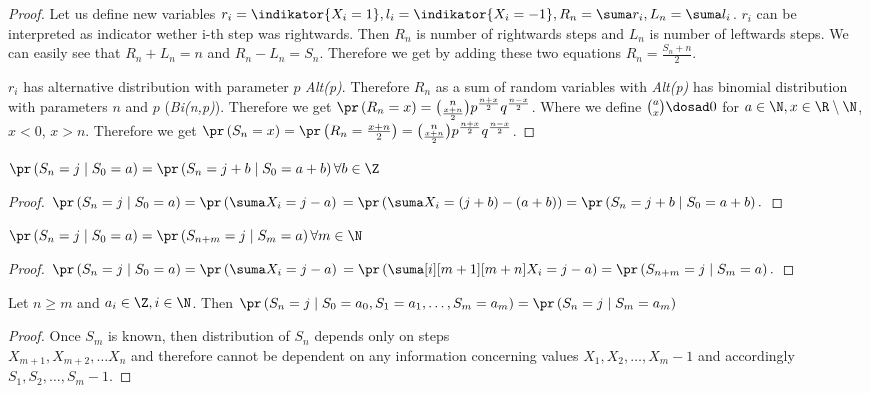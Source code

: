 \begin{proof}
 Let us define new variables $r_i=\indikator{X_i=1}, l_i=\indikator{X_i=-1}, R_n=\suma r_i, L_n=\suma l_i$.
 $r_i$ can be interpreted as indicator wether i-th step was rightwards. Then $R_n$ is number of rightwards steps and $L_n$ is number of leftwards steps. We can easily see that $R_n+L_n=n$ and $R_n-L_n=S_n$.
 Therefore we get by adding these two equations $R_n=\frac{S_n+n}{2}.$

 $r_i$ has alternative distribution with parameter $p$ \textit{Alt(p)}. Therefore $R_n$ as a sum of \iid random variables with \textit{Alt(p)} has binomial distribution with parameters $n$ and $p$ (\textit{Bi(n,p)}).
 Therefore we get $\pr \left(R_n=x \right) =\binom{n}{\frac{x+n}{2}}p^{\frac{n+x}{2}}q^{\frac{n-x}{2}}$. Where we define $\binom{a}{x}\dosad 0$ for $a \in \N, x\in \R \setminus \N$, $x<0$, $x>n$.
 Therefore we get $\pr \left( S_n=x \right) =\pr\left( R_n=\frac{x+n}{2} \right) = \binom{n}{\frac{x+n}{2}}p^{\frac{n+x}{2}}q^{\frac{n-x}{2}}$.
\end{proof}



\begin{lemma}\label{thm-spatial_homogeneity}
 $\pr \left( S_n=j \mid S_0=a \right) =\pr \left( S_n=j+b \mid S_0=a+b \right) \forall b \in \Z$
\end{lemma}

\begin{proof}
    $\pr \left( S_n=j \mid S_0=a \right) =\pr \left( \suma X_i=j-a \right)\\
    =\pr \left( \suma X_i= \left( j+b \right) - \left( a+b \right) \right)
    =\pr \left( S_n=j+b \mid S_0=a+b \right).$
\end{proof}


\begin{lemma}\label{thm-temporal_homogeneity}
 $\pr \left( S_n=j \mid S_0=a \right) =\pr \left( S_{n+m}=j \mid S_m=a \right) \forall m \in \N$
\end{lemma}
\begin{proof}
    $\pr \left( S_n=j \mid S_0=a \right) =\pr \left( \suma X_i=j-a \right) \\
    =\pr \left( \suma[i][m+1][m+n]X_i=j-a \right)
    =\pr \left( S_{n+m}=j \mid S_m=a \right).$
\end{proof}

\begin{lemma}\label{thm-markov_property}
 Let $n\geq m$ and $a_i \in \Z, i\in \N$. Then $\pr \left( S_n=j \mid S_0=a_0, S_1=a_1, \ldots, S_m=a_m \right)
 =\pr \left( S_n=j \mid S_m=a_m \right) $
\end{lemma}
\begin{proof}
 Once $S_m$ is known, then distribution of $S_n$ depends only on steps ~\\$X_{m+1}, X_{m+2}, \ldots X_n$ and therefore cannot be dependent on any information concerning values $X_1, X_2, \ldots, X_m-1$ and accordingly $S_1, S_2, \ldots, S_m-1.$
\end{proof}

